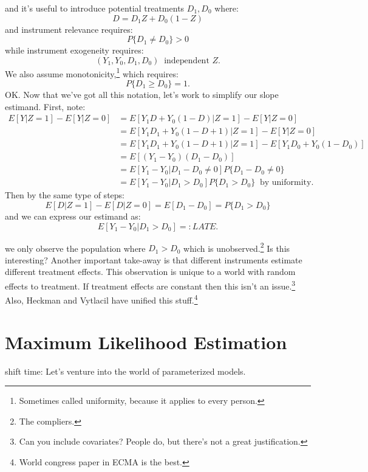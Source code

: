 \documentclass{tufte-book}
\theoremstyle{mytheoremstyle}
\theoremstyle{mylemstyle}
\theoremstyle{mydefstyle}
\begin{document}
and it's useful to introduce potential treatments \(D_1, D_0\) where:
	\[D = D_1 Z + D_0 (1-Z)\]
and instrument relevance requires:
	\[P\{D_1 \ne D_0\} > 0\]
while instrument exogeneity requires:
	\[(Y_1, Y_0, D_1, D_0)\ \text{ independent } Z\text{.}\]
We also assume monotonicity,\footnote{Sometimes called uniformity, because it applies to every person.} which requires:
	\[P\{D_1 \ge D_0\} = 1 \text{.}\]
OK. Now that we've got all this notation, let's work to simplify our slope estimand. First, note:
	\begin{align*}
		E[Y|Z=1] - E[Y|Z=0] &= E[Y_1D + Y_0(1-D)|Z = 1] - E[Y|Z=0] \\
						& = E[Y_1D_1 + Y_0(1-D+1)|Z=1] - E[Y|Z=0] \\
						& = E[Y_1D_1 + Y_0(1-D+1)|Z=1] - E[Y_1D_0 + Y_0(1-D_0)] \\
						& = E[(Y_1 - Y_0)(D_1 - D_0)] \\
						& = E[Y_1 - Y_0 | D_1 - D_0 \ne 0]P\{D_1 - D_0 \ne 0\} \\
						& = E[Y_1 - Y_0 | D_1 > D_0]P\{D_1 > D_0\}\ \text{ by uniformity. }
	\end{align*}
Then by the same type of steps:
	\[E[D|Z = 1] - E[D|Z=0] = E[D_1 - D_0] = P\{D_1 > D_0\}\]
and we can express our estimand as:
	\[E[Y_1 - Y_0 | D_1 > D_0] =: LATE\text{.}\]

 we only observe the population where \(D_1 > D_0\) which is unobserved.\footnote{The compliers.} Is this interesting? Another important take-away is that different instruments estimate different treatment effects. This observation is unique to a world with random effects to treatment. If treatment effects are constant then this isn't an issue.\footnote{Can you include covariates? People do, but there's not a great justification.} Also, Heckman and Vytlacil have unified this stuff.\footnote{World congress paper in ECMA is the best.}

\chapter{Maximum Likelihood Estimation}
 shift time: Let's venture into the world of parameterized models. 
\end{document}
